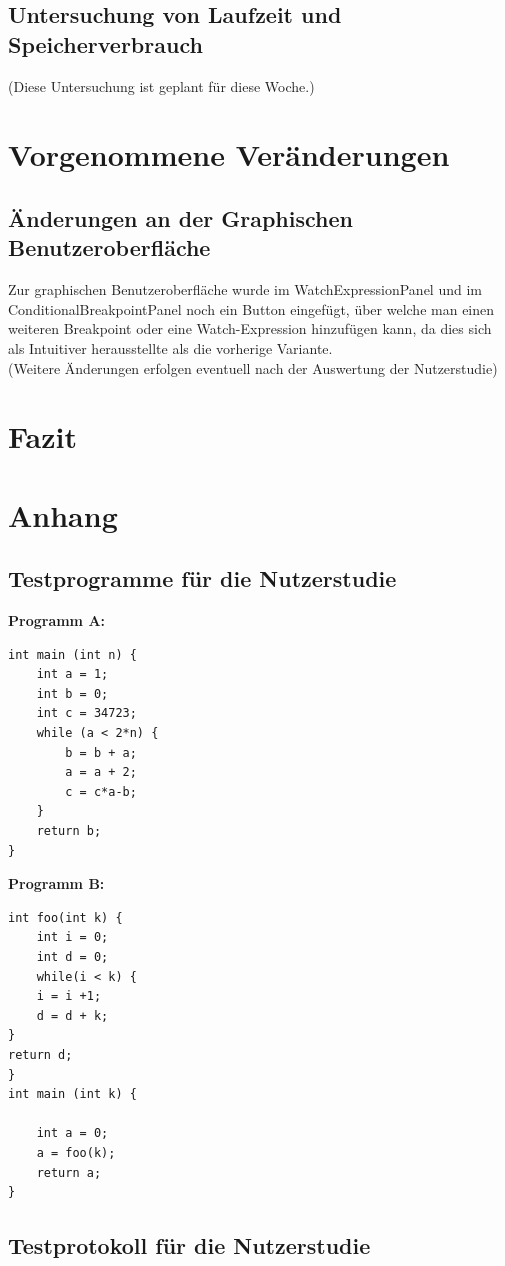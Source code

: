 \documentclass[parskip=full]{scrartcl}
\begin{document}
\subsection{Untersuchung von Laufzeit und Speicherverbrauch}
(Diese Untersuchung ist geplant für diese Woche.)



\newpage

\section{Vorgenommene Veränderungen}

\subsection{Änderungen an der Graphischen Benutzeroberfläche}
Zur graphischen Benutzeroberfläche wurde im WatchExpressionPanel und im ConditionalBreakpointPanel noch ein Button eingefügt, über welche man einen weiteren Breakpoint oder eine Watch-Expression hinzufügen kann, da dies sich als Intuitiver herausstellte als die vorherige Variante. \\
(Weitere Änderungen erfolgen eventuell nach der Auswertung der Nutzerstudie)

\section{Fazit}



\newpage

\printglossary[style=altlist, toctitle=Glossar]
\newpage

\section{Anhang}
\subsection{Testprogramme für die Nutzerstudie}\label{code}
\textbf{Programm A:}
\begin{verbatim}
int main (int n) {
	int a = 1;
	int b = 0;
	int c = 34723;
	while (a < 2*n) {
		b = b + a;
		a = a + 2;
		c = c*a-b;
	}
	return b;
}
\end{verbatim}

\textbf{Programm B:}
\begin{verbatim}
int foo(int k) {
	int i = 0;
	int d = 0;
	while(i < k) {
	i = i +1;
	d = d + k;
}
return d;
}
int main (int k) {

	int a = 0;
	a = foo(k);
	return a;
}
\end{verbatim}

\subsection{Testprotokoll für die Nutzerstudie}\label{usertest}


\end{document}
